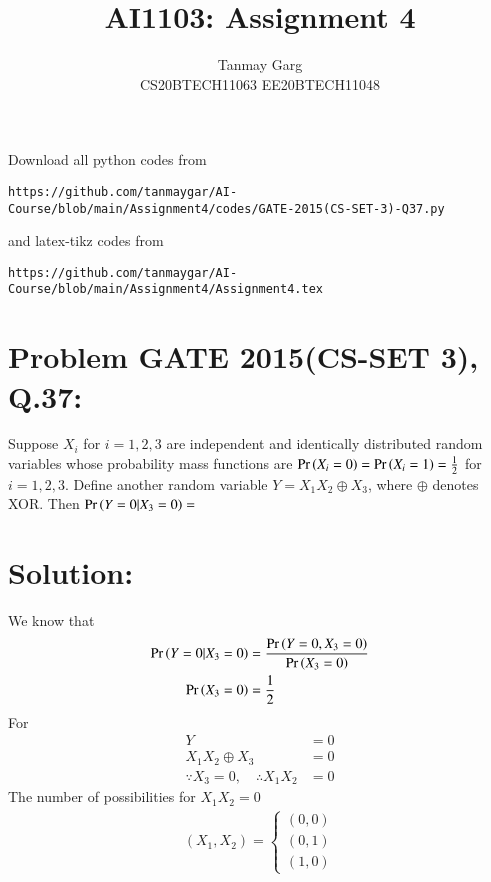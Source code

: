 \documentclass[journal,12pt,twocolumn]{IEEEtran}
\begin{document}
     \def\rightbox#1{\makebox[0in][r]{#1}}
     \def\centbox#1{\makebox[0in]{#1}}
     \def\topbox#1{\raisebox{-\baselineskip}[0in][0in]{#1}}
     \def\midbox#1{\raisebox{-0.5\baselineskip}[0in][0in]{#1}}
\vspace{3cm}
\title{AI1103: Assignment 4}
\author{Tanmay Garg \\CS20BTECH11063 EE20BTECH11048}
\maketitle
\newpage
\bigskip
\renewcommand{\thefigure}{\theenumi}
\renewcommand{\thetable}{\theenumi}
Download all python codes from 
\begin{lstlisting}
https://github.com/tanmaygar/AI-Course/blob/main/Assignment4/codes/GATE-2015(CS-SET-3)-Q37.py
\end{lstlisting}
%
and latex-tikz codes from 
%
\begin{lstlisting}
https://github.com/tanmaygar/AI-Course/blob/main/Assignment4/Assignment4.tex
\end{lstlisting}
\section*{Problem GATE 2015(CS-SET 3), Q.37: }
Suppose $X_i$ for $i = 1, 2, 3$ are independent
and identically distributed random variables
whose probability mass functions are
$\Pr\left(X_i = 0\right) = \Pr\left(X_i = 1\right) = \frac{1}{2}$ for $i = 1, 2, 3$.
Define another random variable $Y = X_1 X_2 \oplus X_3$, where $\oplus$ denotes XOR. Then $\Pr\left(Y = 0|X_3 = 0\right) =$

\section*{Solution:}
We know that
\begin{align}
    \Pr\left(Y=0|X_3=0\right) &= \dfrac{\Pr\left(Y=0,X_3=0\right)}{\Pr\left(X_3=0\right)}\\
    \Pr\left(X_3 = 0\right) &= \frac{1}{2}
\end{align}
For
\begin{align}
    Y &= 0\\
    X_1X_2 \oplus X_3 &= 0\\
    \because X_3 = 0,\quad \therefore X_1X_2 &= 0
\end{align}
The number of possibilities for $X_1X_2=0$
\begin{align}
    (X_1,X_2) = \begin{cases}
(0,0)\\(0,1)\\(1,0)
\end{cases}
\end{align}
\end{document}
